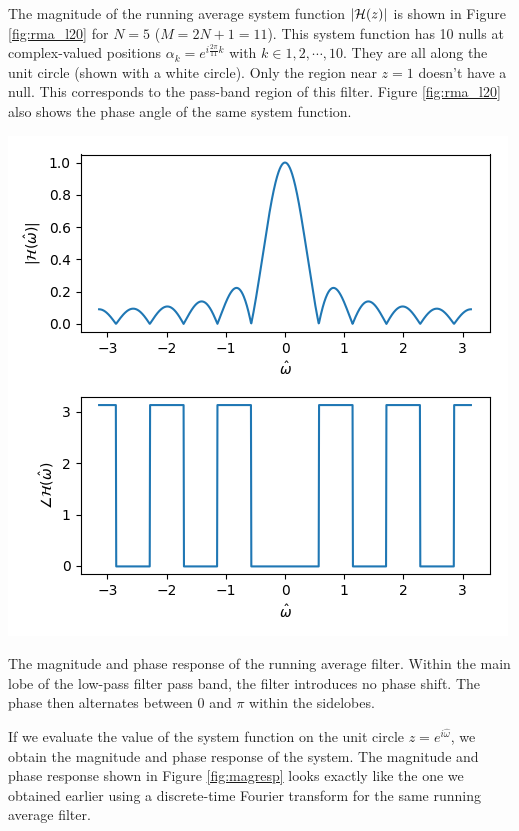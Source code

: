 The magnitude of the running average system function $|\mathcal{H}(z)|$ is shown
in Figure \ref{fig:rma_l20} for $N=5$ ($M=2N+1 = 11$). This system
function has 10 nulls at complex-valued positions
$\alpha_k=e^{i\frac{2\pi}{11}k}$ with $k\in {1,2,\cdots,10}$. They are
all along the unit circle (shown with a white circle). Only the region
near $z=1$ doesn't have a null. This corresponds to the pass-band
region of this filter. Figure \ref{fig:rma_l20} also shows the phase
angle of the same system function.
\begin{marginfigure}
\begin{center}
\includegraphics[width=\textwidth]{code/025_system_function/rma_magresp.png}
\end{center}
\caption{The magnitude and phase response of the running average
  filter. Within the main lobe of the low-pass filter pass band, the
  filter introduces no phase shift. The phase then alternates between
  0 and $\pi$ within the sidelobes.}
\label{fig:magresp}
\end{marginfigure}

If we evaluate the value of the system function on the unit circle
$z=e^{i\hat{\omega}}$, we obtain the magnitude and phase response of
the system. The magnitude and phase response shown in Figure
\ref{fig:magresp} looks exactly like the one we obtained earlier using
a discrete-time Fourier transform for the same running average filter.

